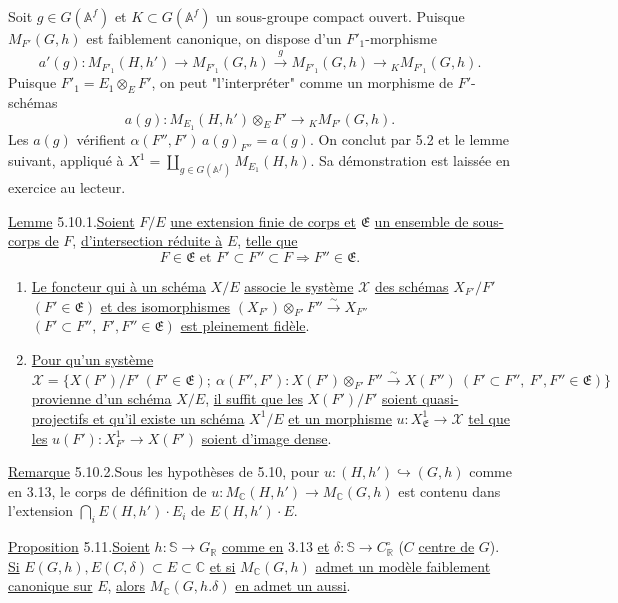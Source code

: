 \documentclass[10pt]{article}
\newcommand{\Af}{\mathbb A^f}
\newcommand{\C}{\mathbb C}
\newcommand{\R}{\mathbb R}
\newcommand{\bS}{\mathbb S}
\newcommand{\MC}{M_{\C}}
\begin{document}
Soit $g\in G(\Af)$ et $K\subset G(\Af)$ un sous-groupe compact ouvert. Puisque $M_{F'}(G,h)$ est faiblement canonique, on dispose d'un $F'_1$-morphisme
\[
a'(g):M_{F'_1}(H,h')\longrightarrow M_{F'_1}(G,h)
 \xrightarrow{\ g\ } M_{F'_1}(G,h)
 \longrightarrow {}_K M_{F'_1}(G,h).
\]
Puisque $F'_1=E_1\otimes_EF'$, on peut "l'interpréter" comme un morphisme de $F'$-schémas
\[
a(g):M_{E_1}(H,h')\otimes_EF'\longrightarrow {}_K M_{F'}(G,h).
\]
Les $a(g)$ vérifient $\alpha(F'',F')\,a(g)_{F''}=a(g)$. On conclut par 5.2 et le lemme suivant, appliqué à $X^1=\coprod_{g\in G(\Af)}M_{E_1}(H,h)$. Sa démonstration est laissée en exercice au lecteur.

\noindent \uline{Lemme} 5.10.1.\quad \uline{Soient} $F/E$ \uline{une extension finie de corps et} $\mathfrak E$ \uline{un ensemble de sous-corps de} $F$, \uline{d'intersection réduite à} $E$, \uline{telle que}
\[
F\in\mathfrak E\text{ et }F'\subset F''\subset F\Longrightarrow F''\in\mathfrak E.
\]
\begin{enumerate}[label=(\roman*)]
\item \uline{Le foncteur qui à un schéma} $X/E$ \uline{associe le système} $\mathcal X$ \uline{des schémas} $X_{F'}/F'$ $(F'\in\mathfrak E)$ \uline{et des isomorphismes} $(X_{F'})\otimes_{F'}F''\xrightarrow{\sim}X_{F''}$ $(F'\subset F'',\ F',F''\in\mathfrak E)$ \uline{est pleinement fidèle}.
\item \uline{Pour qu'un système} $\mathcal X=\{X(F')/F'\ (F'\in\mathfrak E);\allowbreak\ \alpha(F'',F'):X(F')\otimes_{F'}F''\xrightarrow{\sim}X(F'')\allowbreak\ (F'\subset F'',\ F',F''\in\mathfrak E)\}$ \uline{provienne d'un schéma} $X/E$, \uline{il suffit que les} $X(F')/F'$ \uline{soient quasi-projectifs et qu'il existe un schéma} $X^1/E$ \uline{et un morphisme} $u:X^1_{\mathfrak E}\longrightarrow\mathcal X$ \uline{tel que les} $u(F'):X^1_{F'}\longrightarrow X(F')$ \uline{soient d'image dense}.
\end{enumerate}

\noindent \uline{Remarque} 5.10.2.\quad Sous les hypothèses de 5.10, pour $u:(H,h')\hookrightarrow(G,h)$ comme en 3.13, le corps de définition de $u:\MC(H,h')\longrightarrow\MC(G,h)$ est contenu dans l'extension $\bigcap_i E(H,h')\cdot E_i$ de $E(H,h')\cdot E$.

\noindent \uline{Proposition} 5.11.\quad \uline{Soient} $h:\bS\longrightarrow G_\R$ \uline{comme en} 3.13 \uline{et} $\delta:\bS\longrightarrow C^\circ_\R$ ($C$ \uline{centre de} $G$). \uline{Si} $E(G,h),E(C,\delta)\subset E\subset\C$ \uline{et si} $\MC(G,h)$ \uline{admet un modèle faiblement canonique sur} $E$, \uline{alors} $\MC(G,h.\delta)$ \uline{en admet un aussi}.
\end{document}
